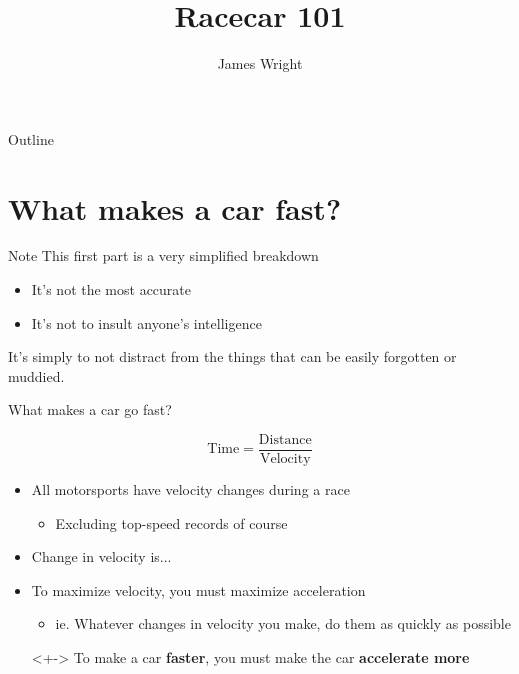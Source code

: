 \documentclass[aspectratio=169]{beamer}
\title{Racecar 101}
\author{James Wright}
\begin{document}
\begin{frame}
    \titlepage
\end{frame}

\logo{}

\begin{frame}{Outline}
    \tableofcontents
\end{frame}

\section{What makes a car fast?}

\begin{frame}
    \begin{alertblock}{Note}
        This first part is a very simplified breakdown
        \begin{itemize}
            \item It's not the most accurate
            \item It's not to insult anyone's intelligence
        \end{itemize}
        It's simply to not distract from the things that can be easily
        forgotten or muddied.
    \end{alertblock}
\end{frame}

\begin{frame}{What makes a car go fast?}

    \onslide<+-> {
        \begin{equation*}
            \mathrm{Time} = \frac{\mathrm{Distance}}{\mathrm{Velocity}}
        \end{equation*}
    }

    \begin{itemize}
        \item<+-> All motorsports have velocity changes during a race
            \begin{itemize}
                \item Excluding top-speed records of course
            \end{itemize}
        \item<+-> Change in velocity is... 
        \item<+-> To maximize velocity, you must maximize acceleration
            \begin{itemize}
                \item ie. Whatever changes in velocity you make, do them as quickly as possible
            \end{itemize}
        \begin{block}{}<+->
            To make a car \textbf{faster}, you must make the car \textbf{accelerate more}
        \end{block}
    \end{itemize}

\end{frame}
\end{document}
